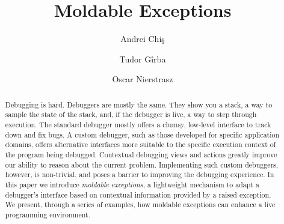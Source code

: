 \documentclass[sigplan,anonymous,review,10pt]{acmart}
\begin{document}
\title{Moldable Exceptions}
\author{Andrei Chi\c{s}}
\author{Tudor G\^irba}
\author{Oscar Nierstrasz}

\renewcommand{\shortauthors}{Chi\c{s} et al.}

\begin{abstract}
Debugging is hard.
Debuggers are mostly the same.
They show you a stack, a way to sample the state of the stack, and, if the debugger is live, a way to step through execution.
The standard debugger mostly offers a clumsy, low-level interface to track down and fix bugs.
A custom debugger, such as those developed for specific application domains, offers alternative interfaces more suitable to the specific execution context of the program being debugged.
Contextual debugging views and actions greatly improve our ability to reason about the current problem.
Implementing such custom debuggers, however, is non-trivial, and poses a barrier to improving the debugging experience.
In this paper we introduce \emph{moldable exceptions}, a lightweight mechanism to adapt a debugger's interface based on contextual information provided by a raised exception.
We present, through a series of examples, how moldable exceptions can enhance a live programming environment.
\end{abstract}


\end{document}
